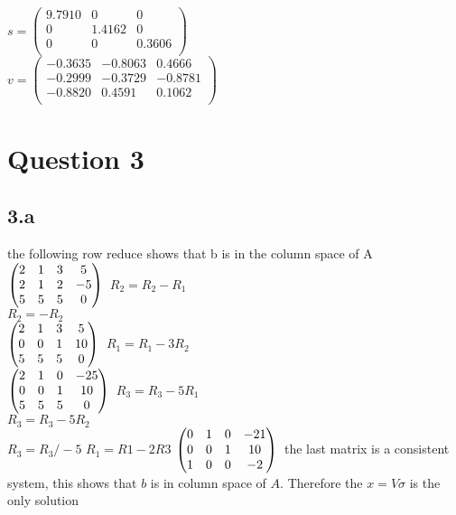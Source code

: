 \documentclass{article}
\begin{document}
$s =
\begin{pmatrix}
    9.7910   &      0    &     0\\
         0   & 1.4162    &     0\\
         0   &      0   & 0.3606\\

\end{pmatrix}$\\

$v =
\begin{pmatrix}
   -0.3635 &  -0.8063  &  0.4666\\
   -0.2999 &  -0.3729 &  -0.8781\\
   -0.8820  &  0.4591 &   0.1062\\
\end{pmatrix}$
\section{Question 3}
\subsection*{3.a}
the following row reduce shows that b is in the column space of A
$
\begin{pmatrix}
   2 &  1  &  3 & 5\\
   2 &  1 &  2 & -5\\
   5  & 5 &  5 & 0\\
\end{pmatrix} \\
$
$R_2 = R_2 - R_1$\\
$R_2 = -R_2$\\
$
\begin{pmatrix}
   2 &  1  &  3 & 5\\
   0 &  0 &  1 & 10\\
   5  & 5 &  5 & 0\\
\end{pmatrix} \\
$
$R_1 = R_1 - 3R_2$\\
$
\begin{pmatrix}
   2 &  1  &  0 & -25\\
   0 &  0 &  1 & 10\\
   5  & 5 &  5 & 0\\
\end{pmatrix} \\
$
$R_3 = R_3 - 5R_1$\\
$R_3 =R_3 - 5R_2$\\
$R_3 = R_3/-5$
$R_1 = R1 - 2R3$
$
\begin{pmatrix}
   0 &  1  &  0 & -21\\
   0 &  0 &  1 & 10\\
   1  & 0 &  0 & -2\\
\end{pmatrix} \\
$
the last matrix is a consistent system, this shows that $b$ is in column space of $A$. Therefore the $x = V\sigma$ is the only solution
\end{document}
